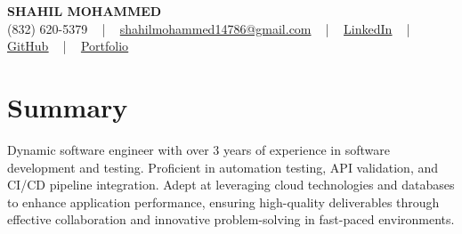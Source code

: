 \documentclass[letterpaper,10pt]{article}
\begin{document}
\begin{center}
    {\fontsize{14pt}{12pt}\selectfont \textbf{\MakeUppercase{Shahil Mohammed}}}\\ \vspace{2pt}
    \fontsize{10pt}{12pt}\selectfont (832) 620-5379 ~ | ~ \href{mailto:shahilmohammed14786@gmail.com}{shahilmohammed14786@gmail.com} ~ | ~  
    \href{https://www.linkedin.com/in/shahil-mohammed-9652931a1/}{\color{blue}\underline{LinkedIn}}  ~ | ~ 
    \href{https://github.com/freakbeast14}{\color{blue}\underline{GitHub}} ~ | ~ 
    \href{https://shahil-mohammed.netlify.app/}{\color{blue}\underline{Portfolio}}
    \vspace{-8pt}
\end{center}

\section{Summary}
\vspace{-2pt}\fontsize{8pt}{9pt}\selectfont
Dynamic software engineer with over 3 years of experience in software development and testing. Proficient in automation testing, API validation, and CI/CD pipeline integration. Adept at leveraging cloud technologies and databases to enhance application performance, ensuring high-quality deliverables through effective collaboration and innovative problem-solving in fast-paced environments.
 \vspace{-5pt}
 
\vspace{-2pt}
\end{document}

